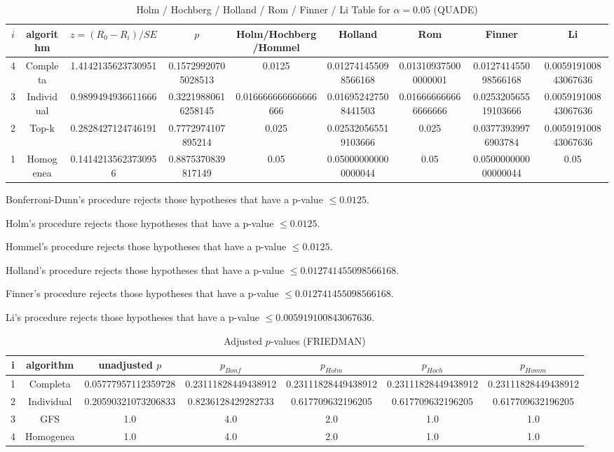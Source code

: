 \documentclass[a4paper,10pt]{article}
\begin{document}
\begin{landscape}
\newpage

\begin{table}[!htp]
\centering\scriptsize
\caption{Holm / Hochberg / Holland / Rom / Finner / Li Table for $\alpha=0.05$ (QUADE)}
\begin{tabular}{ccccccccc}
$i$&algorithm&$z=(R_0 - R_i)/SE$&$p$&Holm/Hochberg/Hommel&Holland&Rom&Finner&Li\\
\hline
4&Completa&1.4142135623730951&0.15729920705028513&0.0125&0.012741455098566168&0.013109375000000001&0.012741455098566168&0.005919100843067636\\
3&Individual&0.9899494936611666&0.32219880616258145&0.016666666666666666&0.016952427508441503&0.016666666666666666&0.025320565519103666&0.005919100843067636\\
2&Top-k&0.2828427124746191&0.7772974107895214&0.025&0.025320565519103666&0.025&0.03773939976903784&0.005919100843067636\\
1&Homogenea&0.14142135623730956&0.8875370839817149&0.05&0.050000000000000044&0.05&0.050000000000000044&0.05\\
\hline
\end{tabular}
\end{table}
Bonferroni-Dunn's procedure rejects those hypotheses that have a p-value $\le0.0125$.


Holm's procedure rejects those hypotheses that have a p-value $\le0.0125$.


Hommel's procedure rejects those hypotheses that have a p-value $\le0.0125$.


Holland's procedure rejects those hypotheses that have a p-value $\le0.012741455098566168$.


Finner's procedure rejects those hypotheses that have a p-value $\le0.012741455098566168$.


Li's procedure rejects those hypotheses that have a p-value $\le0.005919100843067636$.



\newpage

\begin{table}[!htp]
\centering\scriptsize
\caption{Adjusted $p$-values (FRIEDMAN)}
\begin{tabular}{ccccccc}
i&algorithm&unadjusted $p$&$p_{Bonf}$&$p_{Holm}$&$p_{Hoch}$&$p_{Homm}$\\
\hline
1&Completa&0.05777957112359728&0.23111828449438912&0.23111828449438912&0.23111828449438912&0.23111828449438912\\
2&Individual&0.20590321073206833&0.8236128429282733&0.617709632196205&0.617709632196205&0.617709632196205\\
3&GFS&1.0&4.0&2.0&1.0&1.0\\
4&Homogenea&1.0&4.0&2.0&1.0&1.0\\
\hline
\end{tabular}
\end{table}


\end{landscape}
\end{document}
